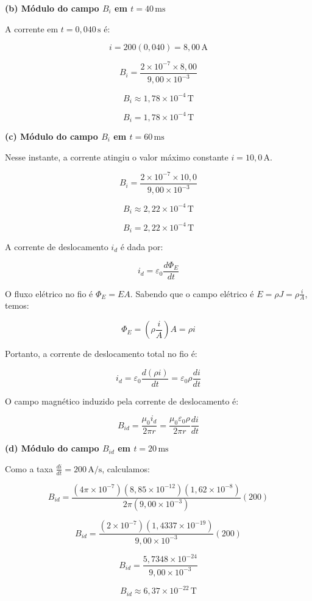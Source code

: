 \documentclass[12pt,a4paper]{article}
\begin{document}
\textbf{(b) Módulo do campo \(B_i\) em \(t = 40\,\text{ms}\)}

A corrente em \(t = 0,040\,\text{s}\) é:

\[
i = 200(0,040) = 8,00\,\text{A}
\]

\[
B_i = \frac{2 \times 10^{-7} \times 8,00}{9,00 \times 10^{-3}}
\]

\[
B_i \approx 1,78 \times 10^{-4}\,\text{T}
\]

\[
\boxed{B_i = 1,78 \times 10^{-4}\,\text{T}}
\]

\textbf{(c) Módulo do campo \(B_i\) em \(t = 60\,\text{ms}\)}

Nesse instante, a corrente atingiu o valor máximo constante \(i = 10,0\,\text{A}\).

\[
B_i = \frac{2 \times 10^{-7} \times 10,0}{9,00 \times 10^{-3}}
\]

\[
B_i \approx 2,22 \times 10^{-4}\,\text{T}
\]

\[
\boxed{B_i = 2,22 \times 10^{-4}\,\text{T}}
\]

A corrente de deslocamento \(i_d\) é dada por:

\[
i_d = \varepsilon_0 \frac{d\Phi_E}{dt}
\]

O fluxo elétrico no fio é \(\Phi_E = E A\). Sabendo que o campo elétrico é \(E = \rho J = \rho \frac{i}{A}\), temos:

\[
\Phi_E = \left(\rho \frac{i}{A}\right) A = \rho i
\]

Portanto, a corrente de deslocamento total no fio é:

\[
i_d = \varepsilon_0 \frac{d(\rho i)}{dt} = \varepsilon_0 \rho \frac{di}{dt}
\]

O campo magnético induzido pela corrente de deslocamento é:

\[
B_{id} = \frac{\mu_0 i_d}{2\pi r} = \frac{\mu_0 \varepsilon_0 \rho}{2\pi r} \frac{di}{dt}
\]

\textbf{(d) Módulo do campo \(B_{id}\) em \(t = 20\,\text{ms}\)}

Como a taxa \(\frac{di}{dt} = 200\,\text{A/s}\), calculamos:

\[
B_{id} = \frac{(4\pi \times 10^{-7})(8,85 \times 10^{-12})(1,62 \times 10^{-8})}{2\pi(9,00 \times 10^{-3})} (200)
\]

\[
B_{id} = \frac{(2 \times 10^{-7})(1,4337 \times 10^{-19})}{9,00 \times 10^{-3}} (200)
\]

\[
B_{id} = \frac{5,7348 \times 10^{-24}}{9,00 \times 10^{-3}}
\]

\[
B_{id} \approx 6,37 \times 10^{-22}\,\text{T}
\]
\end{document}
